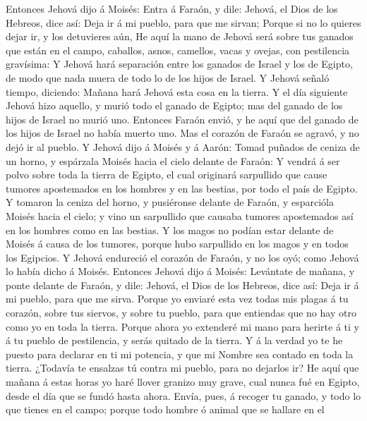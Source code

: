  Entonces Jehová dijo á Moisés: Entra á Faraón, y dile:
Jehová, el Dios de los Hebreos, dice así: Deja ir á mi pueblo, para que
me sirvan;  Porque si no lo quieres dejar ir, y los
detuvieres aún,  He aquí la mano de Jehová será sobre tus
ganados que están en el campo, caballos, asnos, camellos, vacas y
ovejas, con pestilencia gravísima:  Y Jehová hará separación
entre los ganados de Israel y los de Egipto, de modo que nada muera de
todo lo de los hijos de Israel.  Y Jehová señaló tiempo,
diciendo: Mañana hará Jehová esta cosa en la tierra.  Y el
día siguiente Jehová hizo aquello, y murió todo el ganado de Egipto; mas
del ganado de los hijos de Israel no murió uno.  Entonces
Faraón envió, y he aquí que del ganado de los hijos de Israel no había
muerto uno. Mas el corazón de Faraón se agravó, y no dejó ir al pueblo.
 Y Jehová dijo á Moisés y á Aarón: Tomad puñados de ceniza
de un horno, y espárzala Moisés hacia el cielo delante de Faraón:
 Y vendrá á ser polvo sobre toda la tierra de Egipto, el
cual originará sarpullido que cause tumores apostemados en los hombres y
en las bestias, por todo el país de Egipto.  Y tomaron la
ceniza del horno, y pusiéronse delante de Faraón, y esparcióla Moisés
hacia el cielo; y vino un sarpullido que causaba tumores apostemados así
en los hombres como en las bestias.  Y los magos no podían
estar delante de Moisés á causa de los tumores, porque hubo sarpullido
en los magos y en todos los Egipcios.  Y Jehová endureció
el corazón de Faraón, y no los oyó; como Jehová lo había dicho á Moisés.
 Entonces Jehová dijo á Moisés: Levántate de mañana, y
ponte delante de Faraón, y dile: Jehová, el Dios de los Hebreos, dice
así: Deja ir á mi pueblo, para que me sirva.  Porque yo
enviaré esta vez todas mis plagas á tu corazón, sobre tus siervos, y
sobre tu pueblo, para que entiendas que no hay otro como yo en toda la
tierra.  Porque ahora yo extenderé mi mano para herirte á
ti y á tu pueblo de pestilencia, y serás quitado de la tierra.
 Y á la verdad yo te he puesto para declarar en ti mi
potencia, y que mi Nombre sea contado en toda la tierra. 
¿Todavía te ensalzas tú contra mi pueblo, para no dejarlos ir?
 He aquí que mañana á estas horas yo haré llover granizo
muy grave, cual nunca fué en Egipto, desde el día que se fundó hasta
ahora.  Envía, pues, á recoger tu ganado, y todo lo que
tienes en el campo; porque todo hombre ó animal que se hallare en el
